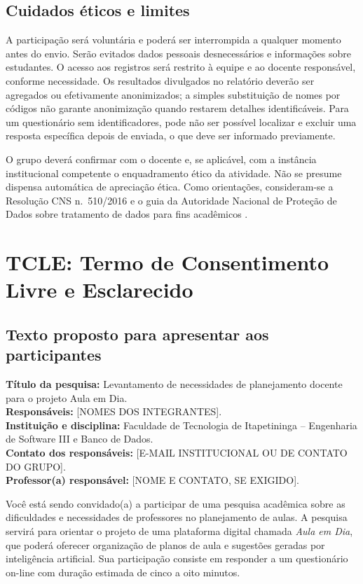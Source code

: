 \documentclass[12pt,a4paper,oneside]{report}
\begin{document}
\subsection{Cuidados éticos e limites}
A participação será voluntária e poderá ser interrompida a qualquer momento antes do envio. Serão evitados dados pessoais desnecessários e informações sobre estudantes. O acesso aos registros será restrito à equipe e ao docente responsável, conforme necessidade. Os resultados divulgados no relatório deverão ser agregados ou efetivamente anonimizados; a simples substituição de nomes por códigos não garante anonimização quando restarem detalhes identificáveis. Para um questionário sem identificadores, pode não ser possível localizar e excluir uma resposta específica depois de enviada, o que deve ser informado previamente.

O grupo deverá confirmar com o docente e, se aplicável, com a instância institucional competente o enquadramento ético da atividade. Não se presume dispensa automática de apreciação ética. Como orientações, consideram-se a Resolução CNS n.~510/2016 \citep{cns5102016} e o guia da Autoridade Nacional de Proteção de Dados sobre tratamento de dados para fins acadêmicos \citep{anpd2025}.

\section{TCLE: Termo de Consentimento Livre e Esclarecido}
\subsection{Texto proposto para apresentar aos participantes}
\noindent\textbf{Título da pesquisa:} Levantamento de necessidades de planejamento docente para o projeto Aula em Dia.\\
\textbf{Responsáveis:} [NOMES DOS INTEGRANTES].\\
\textbf{Instituição e disciplina:} Faculdade de Tecnologia de Itapetininga -- Engenharia de Software III e Banco de Dados.\\
\textbf{Contato dos responsáveis:} [E-MAIL INSTITUCIONAL OU DE CONTATO DO GRUPO].\\
\textbf{Professor(a) responsável:} [NOME E CONTATO, SE EXIGIDO].

Você está sendo convidado(a) a participar de uma pesquisa acadêmica sobre as dificuldades e necessidades de professores no planejamento de aulas. A pesquisa servirá para orientar o projeto de uma plataforma digital chamada \textit{Aula em Dia}, que poderá oferecer organização de planos de aula e sugestões geradas por inteligência artificial. Sua participação consiste em responder a um questionário on-line com duração estimada de cinco a oito minutos.
\end{document}
